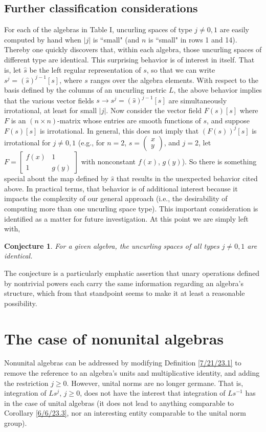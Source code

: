 \documentclass{amsart}
\numberwithin{equation}{section}
\newtheorem*{conjecture}{Conjecture}
\theoremstyle{definition}
\numberwithin{theorem}{section}
\begin{document}
\subsection{Further classification considerations} For each of the algebras in Table I, uncurling spaces of type $j\ne 0,1$ are easily computed by hand when  $|j|$ is ``small" (and $n$ is ``small" in rows 1 and 14).  
Thereby one quickly discovers that, within each algebra, those uncurling spaces of different type are identical.  This surprising behavior is of interest in itself.  That is, let $\hat{s}$ be the left regular representation of $s$, so that we can write $s^j = (\hat{s})^{j-1}[s]$, where $s$ ranges over the algebra elements. With respect to the basis defined by the columns of an uncurling metric $L$, the above behavior implies that the various vector fields $s\rightarrow s^j = (\hat{s})^{j-1}[s]$ are simultaneously irrotational, at least for small $|j|$.  Now consider the vector field $F(s)[s]$ where $F$ is an \mbox{$(n\times n)$-matrix} whose entries are smooth functions of $s$, and suppose $F(s)[s]$ is irrotational.  In general, this does not imply that $(F(s))^j[s]$ is irrotational for $j\ne 0,1$ (e.g., for \mbox{$n=2$}, $s=\left(\begin{array}{ccc}
 x   \\ 
y    
\end{array}\right)$, and $j=2$, let $F= \left[\begin{array}{ccc}
 f(x) & 1   \\ 
 1 & g(y)    
\end{array}\right]$ with nonconstant $f(x)$, $g(y)$).  So there is something special about the map defined by $\hat{s}$ that results in the unexpected behavior cited above. 
In practical terms, that behavior is of additional interest because it impacts the complexity of our general approach (i.e., the desirability of computing more than one uncurling space type).  This important consideration is identified as a matter for future investigation. At this point we are simply left with,
\begin{conjecture} For a given algebra, the uncurling spaces of all types $j\ne 0,1$ are identical. 
\end{conjecture}
\noindent The conjecture is a particularly emphatic assertion that unary operations defined by nontrivial powers each carry the same information regarding an algebra's structure, which from that standpoint seems to make it at least a reasonable possibility.  
 
 \section{The case of nonunital algebras} Nonunital algebras can be addressed by modifying Definition \ref{7/21/23.1} to remove the reference to an algebra's units and multiplicative identity, and adding the restriction $j\ge 0$.   However, unital norms are no longer germane.  That is, integration of $Ls^j$, $j\ge 0$, does not have the interest that integration of $Ls^{-1}$ has in the case of unital algebras (it does not lead to anything comparable to Corollary \ref{6/6/23.3}, nor an interesting entity comparable to the unital norm group).
\end{document}
